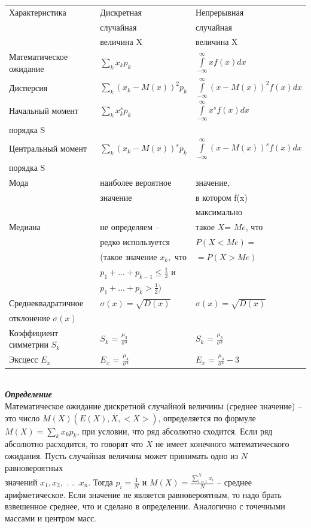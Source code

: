 \documentclass[russian, 12pt, fleqn,x11names]{article}
\begin{document}
\begin{tabular}[b]{ | l | l | l | }
\hline
Характеристика &  Дискретная & Непрерывная   \\
 &  случайная  & случайная  \\
 &  величина X  & величина X  \\
\hline
Математическое ожидание &  $ \sum\limits_{k} x_kp_k$ & $\int\limits_{-\infty}^{\infty}xf(x)dx$\\
Дисперсия & $\sum\limits_{k}^{}(x_k-M(x))^2p_k$ & $\int\limits_{-\infty}^{\infty}(x- M(x))^2f(x)dx$\\
Начальный момент & $\sum\limits_{k} x^s_kp_k$ & $\int\limits_{-\infty}^{\infty}x^sf(x)dx$\\
порядка S& &\\
Центральный момент& $\sum\limits_{k}^{}(x_k-M(x))^sp_k$& $\int\limits_{-\infty}^{\infty}(x- M(x))^sf(x)dx$\\
порядка S& &\\
Мода&наиболее вероятное&значение, \\
& значение& в котором f(x)\\
& &максимально\\
Медиана&не определяем -- &такое $X$= $Me$, что \\
&редко используется&$P(X < Me)=$\\
&(такое значение $x_k,$ что &  $=P(X > Me)$\\
& $p_1+ ...+p_{k - 1} \leq \frac{1}{2}$ и&\\
& $p_1+ ...+p_{k} > \frac{1}{2})$ & \\
Среднеквадратичное  & $\sigma(x) = \sqrt{D(x)}$ & $\sigma(x) = \sqrt{D(x)}$\\
отклонение $\sigma(x)$ & &\\
Коэффициент симметрии $S_k$ & $S_k$ = $\frac{\mu_3}{\sigma^3}$ &  $S_k$ = $\frac{\mu_3}{\sigma^3}$ \\
Эксцесс $E_x$ & $E_x$ = $\frac{\mu_4}{\sigma^4}$ & $E_x$ = $\frac{\mu_4}{\sigma^4} - 3$\\
\hline
\end{tabular}\\
\textit{\textbf{Определение}}\\
Математическое ожидание дискретной случайной величины (среднее значение) -- это число $M(X)(E(X), \overline{X} , <X>)$, определяется по формуле $M(X)=\sum\limits_{k}x_kp_k$, при условии, что ряд абсолютно сходится. Если ряд абсолютно расходится, то говорят что $X$ не имеет конечного математического ожидания. Пусть случайная величина может принимать одно из $N$ равновероятных \\ значений $x_1,x_2,$ . . .$x_n$. Тогда $p_i = \frac{1}{N}$ и $M(X) = \frac{\sum\limits_{i = 1}^{N}  x_i } { N }$ -- среднее арифметическое. Если значение не является равновероятным, то надо брать взвешенное среднее, что и сделано в определении. Аналогично с точечными массами и центром масс.\\
\end{document}
